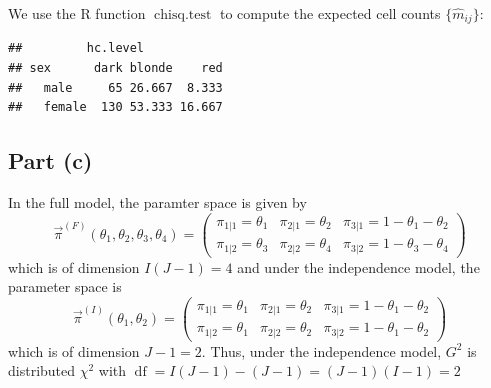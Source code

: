 \documentclass[
]{article}
\newenvironment{Shaded}{\begin{snugshade}}{\end{snugshade}}
\newcommand{\AttributeTok}[1]{\textcolor[rgb]{0.13,0.29,0.53}{#1}}
\newcommand{\ConstantTok}[1]{\textcolor[rgb]{0.56,0.35,0.01}{#1}}
\newcommand{\DecValTok}[1]{\textcolor[rgb]{0.00,0.00,0.81}{#1}}
\newcommand{\FunctionTok}[1]{\textcolor[rgb]{0.13,0.29,0.53}{\textbf{#1}}}
\newcommand{\NormalTok}[1]{#1}
\newcommand{\OtherTok}[1]{\textcolor[rgb]{0.56,0.35,0.01}{#1}}
\newcommand{\SpecialCharTok}[1]{\textcolor[rgb]{0.81,0.36,0.00}{\textbf{#1}}}
\begin{document}
We use the R function \(\operatorname{chisq.test}\) to compute the
expected cell counts \(\{\hat{m}_{i j}\}\):

\begin{Shaded}
\end{Shaded}

\begin{verbatim}
##         hc.level
## sex      dark blonde    red
##   male     65 26.667  8.333
##   female  130 53.333 16.667
\end{verbatim}

\hypertarget{part-c-2}{%
\subsection{Part (c)}\label{part-c-2}}


In the full model, the paramter space is given by \[
  \vec{\pi}^{(F)}(\theta_1,\theta_2, \theta_3, \theta_4) =
  \begin{pmatrix}
    \pi_{1|1} = \theta_1  &  \pi_{2|1} = \theta_2 &   \pi_{3|1} = 1-\theta_1-\theta_2\\
    \pi_{1|2} = \theta_3  &  \pi_{2|2} = \theta_4 &   \pi_{3|2} = 1-\theta_3-\theta_4
  \end{pmatrix}
\] which is of dimension \(I(J-1) = 4\) and under the independence
model, the parameter space is \[
  \vec{\pi}^{(I)}(\theta_1,\theta_2) =
  \begin{pmatrix}
    \pi_{1|1} = \theta_1  &  \pi_{2|1} = \theta_2 &   \pi_{3|1} = 1-\theta_1-\theta_2\\
    \pi_{1|2} = \theta_1  &  \pi_{2|2} = \theta_2 &   \pi_{3|2} = 1-\theta_1-\theta_2
  \end{pmatrix}
\] which is of dimension \(J-1=2\). Thus, under the independence model,
\(G^2\) is distributed \(\chi^2\) with
\(\operatorname{df} = I(J-1) - (J-1) = (J-1)(I-1) = 2\)
\end{document}
